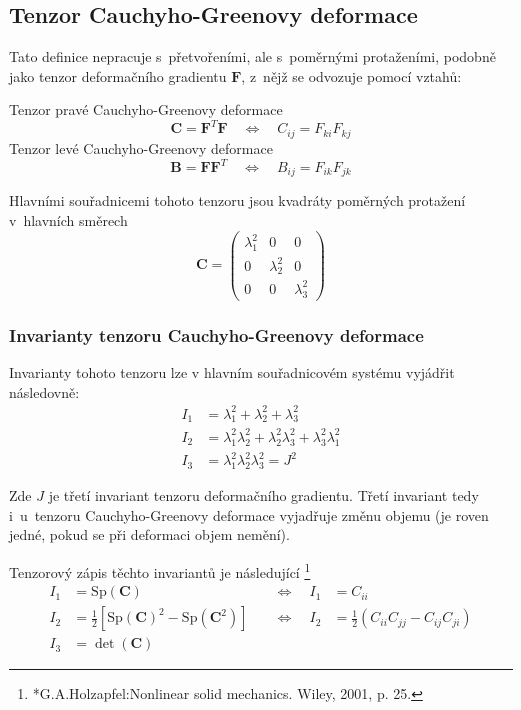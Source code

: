 
\subsection{Tenzor Cauchyho-Greenovy deformace}
Tato definice nepracuje s~přetvořeními, ale s~poměrnými protaženími, podobně jako tenzor deformačního gradientu $\bm{F}$, z~nějž se odvozuje pomocí vztahů:

Tenzor pravé Cauchyho-Greenovy deformace
\begin{equation}
	\bm{C} = \bm{F}^T \bm{F}
	\quad\Leftrightarrow\quad
	C_{ij} = F_{ki} F_{kj}
\end{equation}
Tenzor levé Cauchyho-Greenovy deformace
\begin{equation}
	\bm{B} = \bm{F} \bm{F}^T
	\quad\Leftrightarrow\quad
	B_{ij} = F_{ik} F_{jk}
\end{equation}

Hlavními souřadnicemi tohoto tenzoru jsou kvadráty poměrných protažení v~hlavních směrech
\begin{equation}
	\bm{C} = \left(\begin{matrix}
		\lambda_1^2 & 0 & 0\\
		0 & \lambda_2^2 & 0\\
		0 & 0 & \lambda_3^2
	\end{matrix}\right)
\end{equation}

\subsubsection{Invarianty tenzoru Cauchyho-Greenovy deformace}
Invarianty tohoto tenzoru lze v hlavním souřadnicovém systému vyjádřit následovně:
\begin{align}
	I_1 &= \lambda_1^2 + \lambda_2^2 + \lambda_3^2\\
	I_2 &= \lambda_1^2 \lambda_2^2 + \lambda_2^2 \lambda_3^2 + \lambda_3^2 \lambda_1^2\\
	I_3 &= \lambda_1^2 \lambda_2^2 \lambda_3^2 = J^2
\end{align}

Zde $J$ je třetí invariant tenzoru deformačního gradientu. Třetí invariant tedy i~u~tenzoru Cauchyho-Greenovy deformace vyjadřuje změnu objemu (je roven jedné, pokud se při deformaci objem nemění).

Tenzorový zápis těchto invariantů je následující
\footnote{*G.A.Holzapfel:Nonlinear solid mechanics. Wiley, 2001, p. 25.}
\begin{align}
	I_1 &= \mathrm{Sp}(\bm{C})%
	&\quad\Leftrightarrow\quad
	I_1 &= C_{ii}\\
	I_2 &= \frac{1}{2} \left[\mathrm{Sp}(\bm{C})^2 - \mathrm{Sp}(\bm{C}^2)\right]
	&\quad\Leftrightarrow\quad
	I_2 &= \frac{1}{2} (C_{ii} C_{jj} - C_{ij} C_{ji})\\
	I_3 &= \det(\bm{C})
\end{align}

